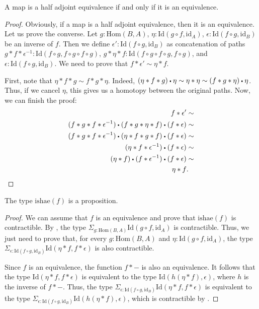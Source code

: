 \documentclass[reqno]{amsart}
\theoremstyle{definition}
\theoremstyle{remark}
\newcommand{\fs}[1]{\mathrm{#1}}
\newcommand{\Hom}{\fs{Hom}}
\newcommand{\Id}{\fs{Id}}
\newcommand{\sym}[1]{#1^{-1}}
\newcommand{\id}{\fs{id}}
\numberwithin{figure}{section}
\newcommand{\ct}{%
  \mathchoice{\mathbin{\raisebox{0.25ex}{$\displaystyle\centerdot$}}}%
             {\mathbin{\raisebox{0.25ex}{$\centerdot$}}}%
             {\mathbin{\raisebox{0.25ex}{$\scriptstyle\,\centerdot\,$}}}%
             {\mathbin{\raisebox{0.25ex}{$\scriptscriptstyle\,\centerdot\,$}}}
}
\begin{document}
\begin{prop}
A map is a half adjoint equivalence if and only if it is an equivalence.
\end{prop}
\begin{proof}
Obviously, if a map is a half adjoint equivalence, then it is an equivalence.
Let us prove the converse.
Let $g : \Hom(B,A)$, $\eta : \Id(g \circ f, \id_A)$, $\epsilon : \Id(f \circ g, \id_B)$ be an inverse of $f$.
Then we define $\epsilon' : \Id(f \circ g, \id_B)$ as concatenation of paths
$g * f * \sym{\epsilon} : \Id(f \circ g, f \circ g \circ f \circ g)$, $g * \eta * f : \Id(f \circ g \circ f \circ g, f \circ g)$, and $\epsilon : \Id(f \circ g, \id_B)$.
We need to prove that $f * \epsilon' \sim \eta * f$.

First, note that $\eta * f * g \sim f * g * \eta$.
Indeed, $(\eta * f * g) \ct \eta \sim \eta * \eta \sim (f * g * \eta) \ct \eta$.
Thus, if we cancel $\eta$, this gives us a homotopy between the original paths.
Now, we can finish the proof:
\begin{align*}
f * \epsilon' & \sim \\
(f * g * f * \sym{\epsilon}) \ct (f * g * \eta * f) \ct (f * \epsilon) & \sim \\
(f * g * f * \sym{\epsilon}) \ct (\eta * f * g * f) \ct (f * \epsilon) & \sim \\
(\eta * f * \sym{\epsilon}) \ct (f * \epsilon) & \sim \\
(\eta * f) \ct (f * \sym{\epsilon}) \ct (f * \epsilon) & \sim \\
\eta * f & .
\end{align*}
\end{proof}

\begin{prop}
The type $\fs{ishae}(f)$ is a proposition.
\end{prop}
\begin{proof}
We can assume that $f$ is an equivalence and prove that $\fs{ishae}(f)$ is contractible.
By , the type $\Sigma_{g : \Hom(B,A)} \Id(g \circ f, \id_A)$ is contractible.
Thus, we just need to prove that, for every $g : \Hom(B,A)$ and $\eta : \Id(g \circ f, \id_A)$, the type $\Sigma_{\epsilon : \Id(f \circ g, \id_B)} \Id(\eta * f, f * \epsilon)$ is also contractible.

Since $f$ is an equivalence, the function $f * -$ is also an equivalence.
It follows that the type $\Id(\eta * f, f * \epsilon)$ is equivalent to the type $\Id(h(\eta * f), \epsilon)$, where $h$ is the inverse of $f * -$.
Thus, the type $\Sigma_{\epsilon : \Id(f \circ g, \id_B)} \Id(\eta * f, f * \epsilon)$ is equivalent to the type $\Sigma_{\epsilon : \Id(f \circ g, \id_B)} \Id(h(\eta * f), \epsilon)$, which is contractible by \cite[Lemma~3.11.8]{hottbook}.
\end{proof}
\end{document}
